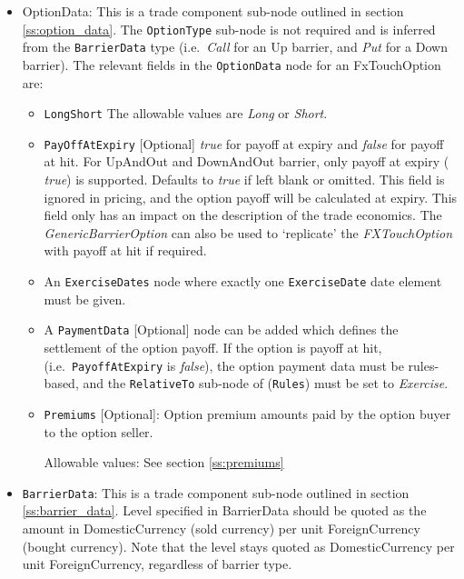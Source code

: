 \begin{itemize}

\item OptionData: This is a trade component sub-node outlined in section \ref{ss:option_data}. The \lstinline!OptionType! sub-node
is not required and is inferred from the \lstinline!BarrierData! type (i.e.\ \emph{Call} for an Up barrier, and \emph{Put} for a Down barrier).
The relevant fields in the \lstinline!OptionData! node for an FxTouchOption are:

\begin{itemize}
\item \lstinline!LongShort! The allowable values are \emph{Long} or \emph{Short}.

\item  \lstinline!PayOffAtExpiry! [Optional] \emph{true} for payoff at expiry and \emph{false} for payoff at hit.
For UpAndOut and DownAndOut barrier, only payoff at expiry ( \emph{true}) is supported. Defaults to  \emph{true} if left blank or omitted. This field is ignored in pricing, and the option payoff will be calculated at expiry. This field only has an impact on the description of the trade economics. The \emph{GenericBarrierOption} can also be used to `replicate' the \emph{FXTouchOption} with payoff at hit if required.

\item An \lstinline!ExerciseDates! node where exactly one \lstinline!ExerciseDate! date element must be given.

\item A \lstinline!PaymentData! [Optional] node can be added which defines the settlement of the option payoff. If the option is payoff at hit,
(i.e.\ \lstinline!PayoffAtExpiry! is \emph{false}), the option payment data must be rules-based, and the \lstinline!RelativeTo! sub-node of (\lstinline!Rules!) must be
set to \emph{Exercise}.

\item \lstinline!Premiums! [Optional]: Option premium amounts paid by the option buyer to the option seller.

Allowable values:  See section \ref{ss:premiums}

\end{itemize}

\item \lstinline!BarrierData!: This is a trade component sub-node outlined in section \ref{ss:barrier_data}.
Level specified in BarrierData should be quoted as the amount in DomesticCurrency (sold currency) per unit ForeignCurrency (bought currency). Note that the level stays quoted as DomesticCurrency per unit ForeignCurrency, regardless of barrier type.


\end{itemize}

